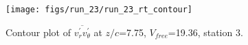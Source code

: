 \begin{figure}[H]
\centering
\texttt{[image: figs/run\_23/run\_23\_rt\_contour]}
\caption{Contour plot of $\overline{v_{r}^{\prime} v_{\theta}^{\prime}}$ at $z/c$=7.75, $V_{free}$=19.36, station 3.}
\label{fig:run_23_rt_contour}
\end{figure}


